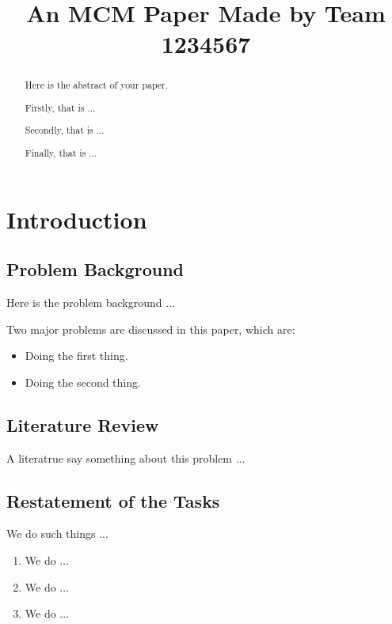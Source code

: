 \documentclass[12pt]{article}  %
\title{An MCM Paper Made by Team 1234567}  %
\begin{document}
\begin{abstract}
    Here is the abstract of your paper.

    Firstly, that is ...

    Secondly, that is ...

    Finally, that is ...


\end{abstract}

\maketitle  %
\tableofcontents  %



\section{Introduction}
\subsection{Problem Background}
Here is the problem background ...

Two major problems are discussed in this paper, which are:
\begin{itemize}
    \item Doing the first thing.
    \item Doing the second thing.
\end{itemize}

\subsection{Literature Review}
A literatrue\cite{1} say something about this problem ...

\subsection{Restatement of the Tasks}
We do such things ...

\begin{enumerate}[\bfseries 1.]
    \item We do ...
    \item We do ...
    \item We do ...
\end{enumerate}
\end{document}
